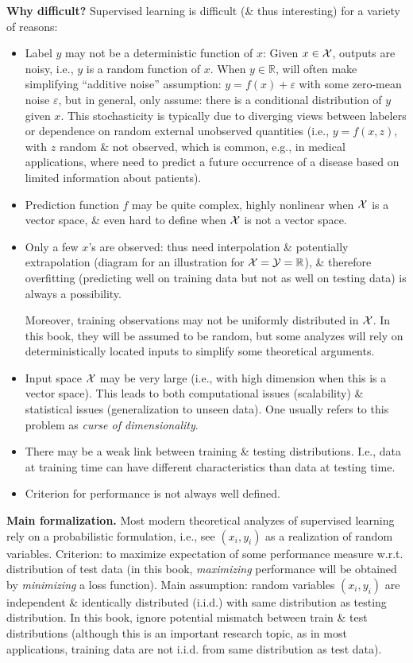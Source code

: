 \documentclass{article}
\begin{document}
\begin{enumerate}
\begin{itemize}
\begin{itemize}
\begin{itemize}
			\end{itemize}
			{\bf Why difficult?} Supervised learning is difficult (\& thus interesting) for a variety of reasons:
			\begin{itemize}
				\item Label $y$ may not be a deterministic function of $x$: Given $x\in{\cal X}$, outputs are noisy, i.e., $y$ is a random function of $x$. When $y\in\mathbb{R}$, will often make simplifying ``additive noise'' assumption: $y = f(x) + \varepsilon$ with some zero-mean noise $\varepsilon$, but in general, only assume: there is a conditional distribution of $y$ given $x$. This stochasticity is typically due to diverging views between labelers or dependence on random external unobserved quantities (i.e., $y = f(x,z)$, with $z$ random \& not observed, which is common, e.g., in medical applications, where need to predict a future occurrence of a disease based on limited information about patients).
				\item Prediction function $f$ may be quite complex, highly nonlinear when ${\cal X}$ is a vector space, \& even hard to define when ${\cal X}$ is not a vector space.
				\item Only a few $x$'s are observed: thus need interpolation \& potentially extrapolation ({\sf diagram for an illustration for ${\cal X} = {\cal Y} = \mathbb{R}$}), \& therefore overfitting (predicting well on training data but not as well on testing data) is always a possibility.
				
				Moreover, training observations may not be uniformly distributed in ${\cal X}$. In this book, they will be assumed to be random, but some analyzes will rely on deterministically located inputs to simplify some theoretical arguments.
				\item Input space ${\cal X}$ may be very large (i.e., with high dimension when this is a vector space). This leads to both computational issues (scalability) \& statistical issues (generalization to unseen data). One usually refers to this problem as {\it curse of dimensionality}.
				\item There may be a weak link between training \& testing distributions. I.e., data at training time can have different characteristics than data at testing time.
				\item Criterion for performance is not always well defined.
			\end{itemize}
			{\bf Main formalization.} Most modern theoretical analyzes of supervised learning rely on a probabilistic formulation, i.e., see $(x_i,y_i)$ as a realization of random variables. Criterion: to maximize expectation of some performance measure w.r.t. distribution of test data (in this book, {\it maximizing} performance will be obtained by {\it minimizing} a loss function). Main assumption: random variables $(x_i,y_i)$ are independent \& identically distributed (i.i.d.) with same distribution as testing distribution. In this book, ignore potential mismatch between train \& test distributions (although this is an important research topic, as in most applications, training data are not i.i.d. from same distribution as test data).
			

\end{itemize}
\end{itemize}
\end{enumerate}
\end{document}
